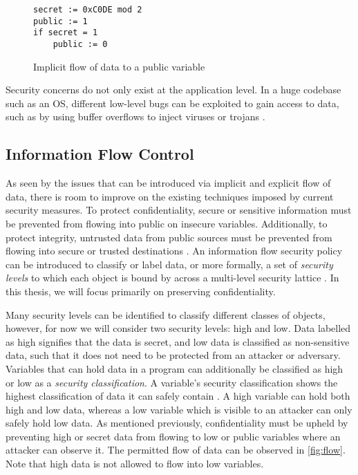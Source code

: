 \begin{figure}
    \begin{lstlisting}
secret := 0xC0DE mod 2
public := 1
if secret = 1
    public := 0
        \end{lstlisting}
    \caption{Implicit flow of data to a public variable}
    \label{fig:implicit}
\end{figure}

Security concerns do not only exist at the application level. In a huge codebase such as an OS, different low-level bugs can be exploited to gain access to data, such as by using buffer overflows to inject viruses or trojans \cite{agten2012recent}.

\subsection{Information Flow Control}
As seen by the issues that can be introduced via implicit and explicit flow of data, there is room to improve on the existing techniques imposed by current security measures. To protect confidentiality, secure or sensitive information must be prevented from flowing into public on insecure variables. Additionally, to protect integrity, untrusted data from public sources must be prevented from flowing into secure or trusted destinations \cite{balliu2014logics}. An information flow security policy can be introduced to classify or label data, or more formally, a set of \textit{security levels} to which each object is bound by across a multi-level security lattice \cite{denning1976lattice}. In this thesis, we will focus primarily on preserving confidentiality.

Many security levels can be identified to classify different classes of objects, however, for now we will consider two security levels: high and low. Data labelled as high signifies that the data is secret, and low data is classified as non-sensitive data, such that it does not need to be protected from an attacker or adversary. Variables that can hold data in a program can additionally be classified as high or low as a \textit{security classification}. A variable's security classification shows the highest classification of data it can safely contain \cite{winter2020information}. A high variable can hold both high and low data, whereas a low variable which is visible to an attacker can only safely hold low data. As mentioned previously, confidentiality must be upheld by preventing high or secret data from flowing to low or public variables where an attacker can observe it. The permitted flow of data can be observed in \ref{fig:flow}. Note that high data is not allowed to flow into low variables.

